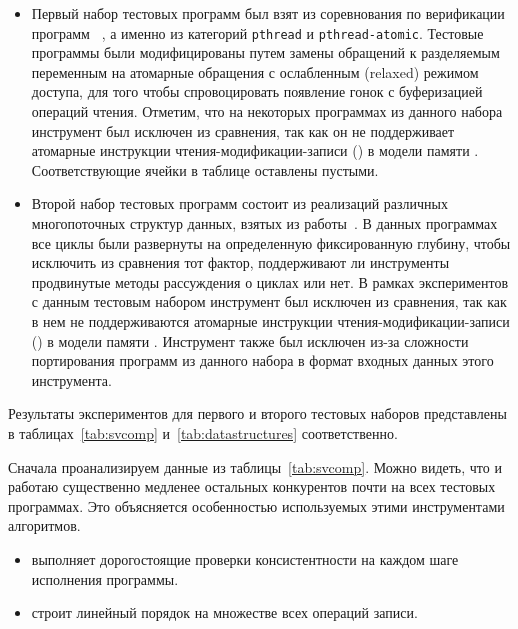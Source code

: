 \begin{itemize}

  \item Первый набор тестовых программ был взят 
    из соревнования по верификации программ \SVCOMP~\cite{SVCOMP}, 
    а именно из категорий \texttt{pthread} и \texttt{pthread-atomic}.
    Тестовые программы были модифицированы путем замены 
    обращений к разделяемым переменным на атомарные обращения 
    с ослабленным (relaxed) режимом доступа, 
    для того чтобы спровоцировать появление гонок 
    с буферизацией операций чтения. 
    Отметим, что на некоторых программах из данного набора 
    инструмент \Nidhugg был исключен из сравнения, так как он не поддерживает 
    атомарные инструкции чтения-модификации-записи (\RMW) в модели памяти \POWER. 
    Соответствующие ячейки в таблице оставлены пустыми.

  \item Второй набор тестовых программ состоит из 
    реализаций различных многопоточных структур данных, 
    взятых из работы~\cite{Norris-Demsky:OOPSLA2013}. 
    В данных программах все циклы были развернуты 
    на определенную фиксированную глубину, чтобы исключить из сравнения тот фактор, 
    поддерживают ли инструменты продвинутые методы рассуждения о циклах или нет. 
    В рамках экспериментов с данным тестовым набором инструмент \Nidhugg 
    был исключен из сравнения, так как в нем не поддерживаются 
    атомарные инструкции чтения-модификации-записи (\RMW) в модели памяти \POWER.
    Инструмент \rmem также был исключен из-за сложности портирования 
    программ из данного набора в формат входных данных этого инструмента.
    
\end{itemize}

Результаты экспериментов для первого и второго 
тестовых наборов представлены в таблицах~\ref{tab:svcomp} 
и~\ref{tab:datastructures} соответственно.



Сначала проанализируем данные из таблицы~\ref{tab:svcomp}. 
Можно видеть, что \Nidhugg и \rmem работаю существенно медленее остальных 
конкурентов почти на всех тестовых программах. 
Это объясняется особенностью используемых этими инструментами алгоритмов.

\begin{itemize}
  \item \Nidhugg выполняет дорогостоящие проверки консистентности
    на каждом шаге исполнения программы.
  \item \rmem строит линейный порядок на множестве всех операций записи.
\end{itemize}

